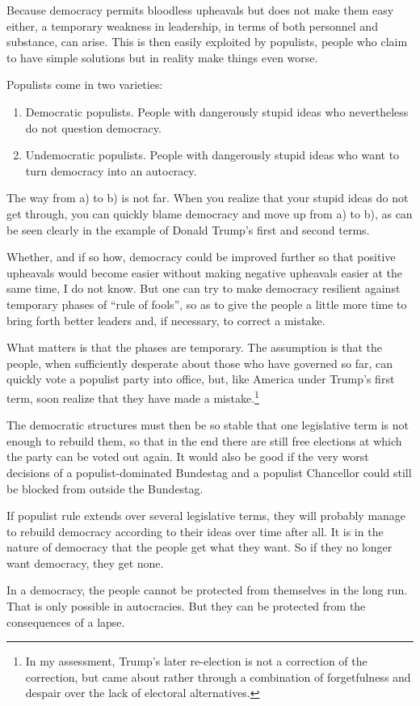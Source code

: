 Because democracy permits bloodless upheavals but does not make them easy either, a temporary weakness in leadership, in terms of both personnel and substance, can arise.
This is then easily exploited by populists, people who claim to have simple solutions but in reality make things even worse.

Populists come in two varieties:
\begin{enumerate}[label=\alph*)]
    \item Democratic populists. People with dangerously stupid ideas who nevertheless do not question democracy.
    \item Undemocratic populists. People with dangerously stupid ideas who want to turn democracy into an autocracy.
\end{enumerate}

The way from a) to b) is not far.
When you realize that your stupid ideas do not get through, you can quickly blame democracy and move up from a) to b), as can be seen clearly in the example of Donald Trump's first and second terms.

Whether, and if so how, democracy could be improved further so that positive upheavals would become easier without making negative upheavals easier at the same time, I do not know.
But one can try to make democracy resilient against temporary phases of \enquote{rule of fools}, so as to give the people a little more time to bring forth better leaders and, if necessary, to correct a mistake.

What matters is that the phases are temporary.
The assumption is that the people, when sufficiently desperate about those who have governed so far, can quickly vote a populist party into office, but, like America under Trump's first term, soon realize that they have made a mistake.\footnote{In my assessment, Trump's later re-election is not a correction of the correction, but came about rather through a combination of forgetfulness and despair over the lack of electoral alternatives.}

The democratic structures must then be so stable that one legislative term is not enough to rebuild them, so that in the end there are still free elections at which the party can be voted out again.
It would also be good if the very worst decisions of a populist-dominated Bundestag and a populist Chancellor could still be blocked from outside the Bundestag.

If populist rule extends over several legislative terms, they will probably manage to rebuild democracy according to their ideas over time after all.
It is in the nature of democracy that the people get what they want.
So if they no longer want democracy, they get none.

In a democracy, the people cannot be protected from themselves in the long run.
That is only possible in autocracies.
But they can be protected from the consequences of a lapse.
